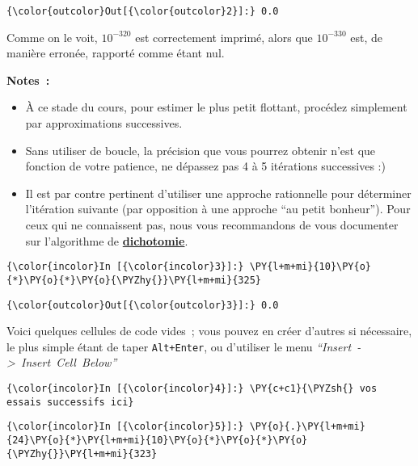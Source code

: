 \begin{Verbatim}[commandchars=\\\{\}]
{\color{outcolor}Out[{\color{outcolor}2}]:} 0.0
\end{Verbatim}
            
    Comme on le voit, \(10^{-320}\) est correctement imprimé, alors que
\(10^{-330}\) est, de manière erronée, rapporté comme étant nul.

    \textbf{Notes~:}

\begin{itemize}
\item
  À ce stade du cours, pour estimer le plus petit flottant, procédez
  simplement par approximations successives.
\item
  Sans utiliser de boucle, la précision que vous pourrez obtenir n'est
  que fonction de votre patience, ne dépassez pas 4 à 5 itérations
  successives :)
\item
  Il est par contre pertinent d'utiliser une approche rationnelle pour
  déterminer l'itération suivante (par opposition à une approche ``au
  petit bonheur''). Pour ceux qui ne connaissent pas, nous vous
  recommandons de vous documenter sur l'algorithme de
  \href{https://fr.wikipedia.org/wiki/Recherche_dichotomique}{\textbf{dichotomie}}.
\end{itemize}

    \begin{Verbatim}[commandchars=\\\{\}]
{\color{incolor}In [{\color{incolor}3}]:} \PY{l+m+mi}{10}\PY{o}{*}\PY{o}{*}\PY{o}{\PYZhy{}}\PY{l+m+mi}{325}
\end{Verbatim}


\begin{Verbatim}[commandchars=\\\{\}]
{\color{outcolor}Out[{\color{outcolor}3}]:} 0.0
\end{Verbatim}
            
    Voici quelques cellules de code vides~; vous pouvez en créer d'autres si
nécessaire, le plus simple étant de taper \texttt{Alt+Enter}, ou
d'utiliser le menu \emph{``Insert~-\textgreater{}~Insert~Cell~Below''}

    \begin{Verbatim}[commandchars=\\\{\}]
{\color{incolor}In [{\color{incolor}4}]:} \PY{c+c1}{\PYZsh{} vos essais successifs ici}
\end{Verbatim}


    \begin{Verbatim}[commandchars=\\\{\}]
{\color{incolor}In [{\color{incolor}5}]:} \PY{o}{.}\PY{l+m+mi}{24}\PY{o}{*}\PY{l+m+mi}{10}\PY{o}{*}\PY{o}{*}\PY{o}{\PYZhy{}}\PY{l+m+mi}{323}
\end{Verbatim}


